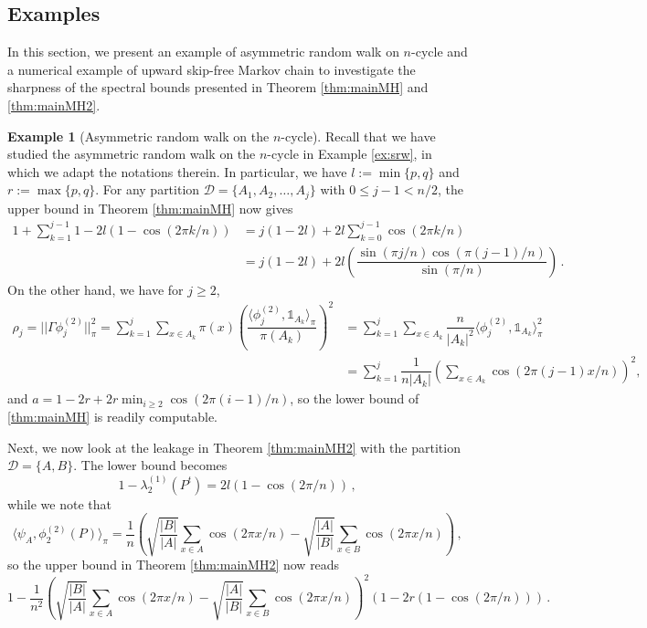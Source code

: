 \documentclass[12pt,a4]{amsart}
\numberwithin{equation}{section}
\theoremstyle{plain}
\theoremstyle{definition}
\newtheorem{example}{Example}[section]
\theoremstyle{remark}
\newcommand{\1}{\mathds{1}}
\renewcommand{\leq}{\leqslant}
\renewcommand{\geq}{\geqslant}
\begin{document}
\subsection{Examples}

In this section, we present an example of asymmetric random walk on $n$-cycle and a numerical example of upward skip-free Markov chain to investigate the sharpness of the spectral bounds presented in Theorem \ref{thm:mainMH} and \ref{thm:mainMH2}.

\begin{example}[Asymmetric random walk on the $n$-cycle]
	Recall that we have studied the asymmetric random walk on the $n$-cycle in Example \ref{ex:srw}, in which we adapt the notations therein. In particular, we have $l := \min\{p,q\}$ and $r := \max\{p,q\}$. For any partition $\mathcal{D} = \{A_1,A_2,\ldots,A_j\}$ with $0 \leq j-1 < n/2$, the upper bound in Theorem \ref{thm:mainMH} now gives
	\begin{align*}
	1 + \sum_{k=1}^{j-1} 1 - 2l (1-\cos(2\pi k/n)) &= j(1-2l) + 2l \sum_{k=0}^{j-1} \cos(2\pi k/n) \\
	&= j(1-2l) + 2l \left( \dfrac{\sin(\pi j/n)\cos(\pi (j-1)/n)}{\sin(\pi/n)} \right)\,.
	\end{align*}
	On the other hand, we have for $j \geq 2$,
	\begin{align*}
	\rho_j = ||\Gamma \phi_j^{(2)}||_{\pi}^2 
	= \sum_{k=1}^{j} \sum_{x \in A_k} \pi(x) \left( \dfrac{\langle \phi_j^{(2)}, \1_{A_k} \rangle_{\pi}}{\pi(A_k)} \right)^2 
	&= \sum_{k=1}^{j} \sum_{x \in A_k} \dfrac{n}{|A_k|^2}  \langle \phi_j^{(2)}, \1_{A_k} \rangle_{\pi}^2 \\
	&= \sum_{k=1}^{j} \dfrac{1}{n|A_k|} \left(\sum_{x \in A_k} \cos(2\pi (j-1)x/n)\right)^2,
	\end{align*}
	and $a = 1-2r + 2r \min_{i \geq 2} \cos(2\pi(i-1)/n)$, so the lower bound of \ref{thm:mainMH} is readily computable.
	
	Next, we now look at the leakage in Theorem \ref{thm:mainMH2} with the partition $\mathcal{D} = \{A,B\}$. The lower bound becomes
	$$	1 - \lambda_2^{(1)}(P^t) = 2l (1-\cos(2\pi/n))\,,$$
	while we note that 
	$$\langle \psi_A, \phi_2^{(2)}(P) \rangle_{\pi} = \dfrac{1}{n}  \left( \sqrt{\dfrac{|B|}{|A|}} \sum_{x \in A} \cos(2\pi x/n) - \sqrt{\dfrac{|A|}{|B|}} \sum_{x \in B} \cos(2\pi x/n)\right)\,,$$
	so the upper bound in Theorem \ref{thm:mainMH2} now reads
	$$1 - \dfrac{1}{n^2}  \left( \sqrt{\dfrac{|B|}{|A|}} \sum_{x \in A} \cos(2\pi x/n) - \sqrt{\dfrac{|A|}{|B|}} \sum_{x \in B} \cos(2\pi x/n)\right)^2 \left( 1 - 2r (1-\cos(2\pi/n)) \right)\,.$$
\end{example}
\end{document}
